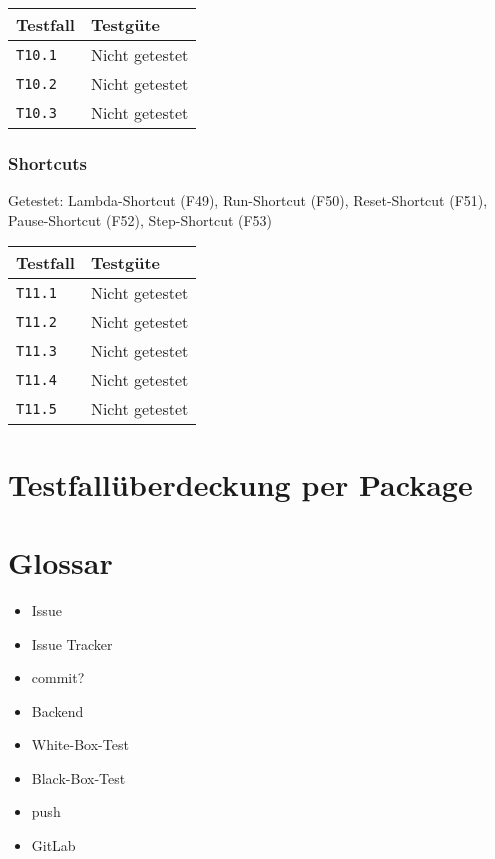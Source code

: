 \documentclass[parskip=full,11pt,twoside]{scrartcl}
\newcommand{\testline}[2]{
    \texttt{#1} & 
    \ifthenelse{\equal{#2}{Nicht getestet}}
        {\cellcolor{red!20}}
        {}
    \ifthenelse{\equal{#2}{Manuell getestet}}
        {\cellcolor{orange!20}}
        {}
    \ifthenelse{\equal{#2}{Automatisiert getestet}}
        {\cellcolor{green!20}}
        {}
    #2 \\ \hline
}
\begin{document}
    \label{shortcuts}
    \begin{center}
        \begin{tabular}{ p{9cm} p{4cm}}
            Testfall & Testgüte \\ \hline
            \testline{T10.1}{Nicht getestet}
            \testline{T10.2}{Nicht getestet}
            \testline{T10.3}{Nicht getestet}
        \end{tabular}
    \end{center}

\subsubsection{Shortcuts}
    Getestet:
    Lambda-Shortcut (F49),
    Run-Shortcut (F50),
    Reset-Shortcut (F51),
    Pause-Shortcut (F52),
    Step-Shortcut (F53)

    \label{shortcuts}
    \begin{center}
        \begin{tabular}{ p{9cm} p{4cm}}
            Testfall & Testgüte \\ \hline
            \testline{T11.1}{Nicht getestet}
            \testline{T11.2}{Nicht getestet}
            \testline{T11.3}{Nicht getestet}
            \testline{T11.4}{Nicht getestet}
            \testline{T11.5}{Nicht getestet}
        \end{tabular}
    \end{center}

\section{Testfallüberdeckung per Package}


\section{Glossar}
\begin{itemize}
    \item Issue
    \item Issue Tracker
    \item commit?
    \item Backend
    \item White-Box-Test
    \item Black-Box-Test
    \item push
    \item GitLab
\end{itemize}
\end{document}
